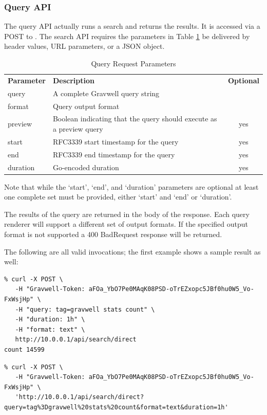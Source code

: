 \subsubsection{Query API}
The query API actually runs a search and returns the results. It is accessed via a POST to . The search API requires the parameters in Table \ref{table:query-parameters} be delivered by header values, URL parameters, or a JSON object.

\begin{table}[H]
\begin{tabular}{llc}
\hline
\textbf{Parameter} & \textbf{Description} & \textbf{Optional} \\
query     & A complete Gravwell query string & \\
format    & Query output format & \\
preview   & Boolean indicating that the query should execute as a preview query & yes \\
start     & RFC3339 start timestamp for the query & yes \\
end       & RFC3339 end timestamp for the query & yes \\
duration  & Go-encoded duration & yes \\
\end{tabular}
\caption{Query Request Parameters}
\label{table:query-parameters}
\end{table}

Note that while the `start', `end', and `duration' parameters are optional at least one complete set must be provided, either `start' and `end' or `duration'.

The results of the query are returned in the body of the response. Each query renderer will support a different set of output formats. If the specified output format is not supported a 400 BadRequest response will be returned.

The following are all valid invocations; the first example shows a sample result as well:

\begin{verbatim}
% curl -X POST \
   -H "Gravwell-Token: aFOa_YbO7Pe0MAqK08PSD-oTrEZxopc5JBf0hu0W5_Vo-FxWsjHp" \
   -H "query: tag=gravwell stats count" \
   -H "duration: 1h" \
   -H "format: text" \
   http://10.0.0.1/api/search/direct
count 14599
\end{verbatim}

\begin{verbatim}
% curl -X POST \
   -H "Gravwell-Token: aFOa_YbO7Pe0MAqK08PSD-oTrEZxopc5JBf0hu0W5_Vo-FxWsjHp" \
   'http://10.0.0.1/api/search/direct?query=tag%3Dgravwell%20stats%20count&format=text&duration=1h'
\end{verbatim}

